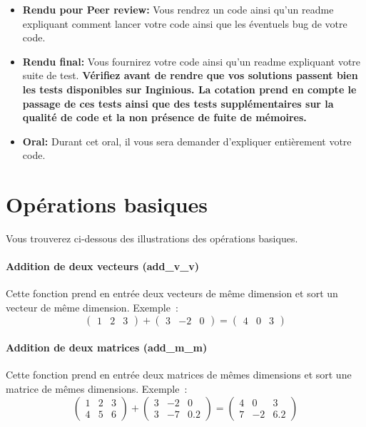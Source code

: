 \documentclass[a4paper, 12pt]{article}
\begin{document}
\begin{itemize}
    \item \textbf{Rendu pour Peer review:} Vous rendrez un code ainsi qu'un readme expliquant comment lancer votre code ainsi que les éventuels bug de votre code. 
    \item \textbf{Rendu final:} Vous fournirez votre code ainsi qu'un readme expliquant votre suite de test. \textbf{Vérifiez avant de rendre que vos solutions passent bien les tests disponibles sur Inginious. La cotation prend en compte le passage de ces tests ainsi que des tests supplémentaires sur la qualité de code et la non présence de fuite de mémoires.}
    \item \textbf{Oral:} Durant cet oral, il vous sera demander d'expliquer entièrement votre code.
\end{itemize}

\appendix
\section{Opérations basiques}\label{app:basic_op}
\noindent Vous trouverez ci-dessous des illustrations des opérations basiques.
\paragraph{Addition de deux vecteurs (add\_v\_v)}
Cette fonction prend en entrée deux vecteurs de même dimension et sort un vecteur de même dimension. Exemple~:
\begin{equation*}
      \begin{pmatrix} 1 &  2 & 3 \end{pmatrix}
    + \begin{pmatrix} 3 & -2 & 0 \end{pmatrix}
    = \begin{pmatrix} 4 &  0 & 3 \end{pmatrix}
\end{equation*}

\paragraph{Addition de deux matrices (add\_m\_m)}
Cette fonction prend en entrée deux matrices de mêmes dimensions et sort une matrice de mêmes dimensions. Exemple~:
\begin{equation*}
      \begin{pmatrix} 1 &  2 & 3 \\ 4 &  5 & 6   \end{pmatrix}
    + \begin{pmatrix} 3 & -2 & 0 \\ 3 & -7 & 0.2 \end{pmatrix}
    = \begin{pmatrix} 4 &  0 & 3 \\ 7 & -2 & 6.2 \end{pmatrix}
\end{equation*}
\end{document}
